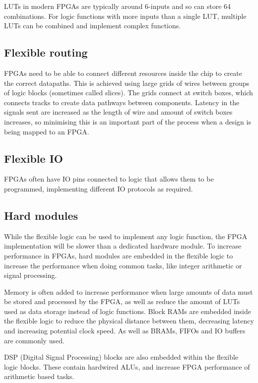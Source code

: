 LUTs in modern FPGAs are typically around 6-inputs and so can store 64 combinations. For logic functions with more inputs than a single LUT, multiple LUTs can be combined and implement complex functions.

\subsection{Flexible routing}
FPGAs need to be able to connect different resources inside the chip to create the correct datapaths. This is achieved using large grids of wires between groups of logic blocks (sometimes called slices). The grids connect at switch boxes, which connects tracks to create data pathways between components. Latency in the signals sent are increased as the length of wire and amount of switch boxes increases, so minimising this is an important part of the process when a design is being mapped to an FPGA.

\subsection{Flexible IO}
FPGAs often have IO pins connected to logic that allows them to be programmed, implementing different IO protocols as required.

\subsection{Hard modules}
While the flexible logic can be used to implement any logic function, the FPGA implementation will be slower than a dedicated hardware module. To increase performance in FPGAs, hard modules are embedded in the flexible logic to increase the performance when doing common tasks, like integer arithmetic or signal processing. 

Memory is often added to increase performance when large amounts of data must be stored and processed by the FPGA, as well as reduce the amount of LUTs used as data storage instead of logic functions. Block RAMs are embedded inside the flexible logic to reduce the physical distance between them, decreasing latency and increasing potential clock speed. As well as BRAMs, FIFOs and IO buffers are commonly used.

DSP (Digital Signal Processing) blocks are also embedded within the flexible logic blocks. These contain hardwired ALUs, and increase FPGA performance of arithmetic based tasks.

